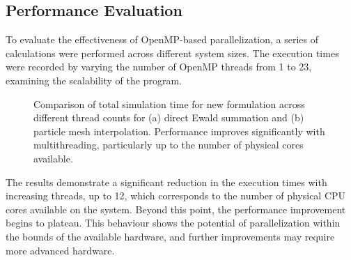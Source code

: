 \subsection{Performance Evaluation}
To evaluate the effectiveness of OpenMP-based parallelization, a series of calculations were performed across different system sizes. The execution times were recorded by varying the number of OpenMP threads from 1 to 23, examining the scalability of the program. 
\begin{figure}[htbp]
    \centering
    \hfill
    \caption{Comparison of total simulation time for new formulation across different thread counts for (a) direct Ewald summation and (b) particle mesh interpolation. Performance improves significantly with multithreading, particularly up to the number of physical cores available.}
    \label{fig:threading}
\end{figure}

The results demonstrate a significant reduction in the execution times with increasing threads, up to 12, which corresponds to the number of physical CPU cores available on the system. Beyond this point, the performance improvement begins to plateau. This behaviour shows the potential of parallelization within the bounds of the available hardware, and further improvements may require more advanced hardware.